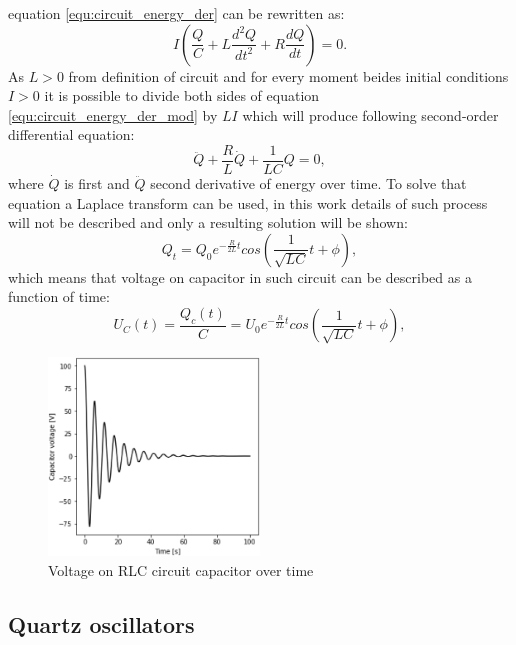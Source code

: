 equation \ref{equ:circuit_energy_der} can be rewritten as:
\begin{equation}
	\label{equ:circuit_energy_der_mod}
	I(\frac{Q}{C} + L\frac{d^{2}Q}{dt^{2}} + R\frac{dQ}{dt}) = 0.
\end{equation}
As $L>0$ from definition of circuit and for every moment beides initial conditions $I>0$ it is
possible to divide both sides of equation \ref{equ:circuit_energy_der_mod} by $LI$ which will
produce following second-order differential equation:
\begin{equation}
	\label{equ:circuit_energy_der_div}
	\ddot{Q} + \frac{R}{L}\dot{Q} + \frac{1}{LC}Q=0,
\end{equation}
where $\dot{Q}$ is first and $\ddot{Q}$ second derivative of energy over time.
To solve that equation a Laplace transform can be used, in this work details of such process
will not be described and only a resulting solution will be shown:
\begin{equation}
	\label{equ:circuit_energy_solved}
	Q_{t}=Q_{0}e^{-\frac{R}{2L}t}cos(\frac{1}{\sqrt{LC}}t+\phi),
\end{equation}
which means that voltage on capacitor in such circuit can be described as a function of time:
\begin{equation}
	\label{qeu:cap_voltage}
	U_{C}(t) = \frac{Q_c(t)}{C} = U_{0}e^{-\frac{R}{2L}t}cos(\frac{1}{\sqrt{LC}}t+\phi), 
\end{equation}
\begin{figure}[htb] 
	\label{fig:rlc_voltage}
	\centering
	\includegraphics[width=0.5\textwidth]{figures/rlc_capacitor}
	\caption{Voltage on RLC circuit capacitor over time}
\end{figure}
\subsection{Quartz oscillators}

